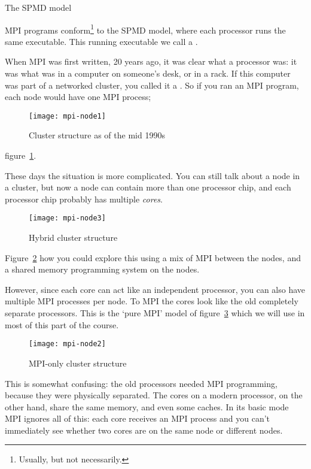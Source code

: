 
%
 {The SPMD model}

MPI programs conform\footnote{Usually, but not necessarily.}
to the \acf{SPMD} model, where each processor runs the same executable.
This running executable we call a .

When MPI was first written, 20 years ago, it was clear what a processor
was: it was what was in a computer on someone's desk, or in a rack.
If this computer was part of a networked cluster, you called it a .
So if you ran an MPI program, each node would have one MPI process;
%
\begin{figure}[ht]
  \texttt{[image: mpi-node1]}
  \caption{Cluster structure as of the mid 1990s}
  \label{fig:oldmpi}
\end{figure}
%
figure~\ref{fig:oldmpi}.

These days the situation is more complicated.
You can still talk about a node in a cluster, but now a node can contain
more than one processor chip, and each processor chip probably has multiple
\emph{cores}.
%
\begin{figure}[ht]
  \texttt{[image: mpi-node3]}
  \caption{Hybrid cluster structure}
  \label{fig:hybridmpi}
\end{figure}
%
Figure~\ref{fig:hybridmpi} how you could explore this using a mix
of MPI between the nodes, and a shared memory programming system on the nodes.

However, since each core can act like an independent processor,
you can also have multiple MPI processes per node. To MPI the cores look
like the old completely separate processors. This is the `pure MPI'
model of figure~\ref{fig:purempi} which we will use in most of this part
of the course.
%
\begin{figure}[ht]
  \texttt{[image: mpi-node2]}
  \caption{MPI-only cluster structure}
  \label{fig:purempi}
\end{figure}
%

This is somewhat confusing: the old processors needed MPI programming, because
they were physically separated. The cores on a modern processor, on the other hand,
share the same memory, and even some caches. In its basic mode MPI ignores all
of this: each core receives an MPI process and you can't immediately see
whether two cores are on the same node or different nodes.

